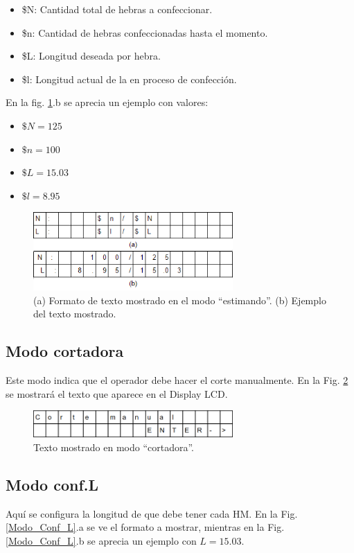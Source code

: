 \documentclass[main_conf.tex]{subfiles}
\begin{document}
\begin{itemize}
\item \$N: Cantidad total de hebras a confeccionar.
\item \$n: Cantidad de hebras confeccionadas hasta el momento.
\item \$L: Longitud deseada por hebra.
\item \$l: Longitud actual de la en proceso de confección.
\end{itemize}

En la fig. \ref{Modo_estimando}.b se aprecia un ejemplo con valores:
\begin{itemize}
\item $\$N = 125$
\item $\$n = 100$
\item $\$L = 15.03$
\item $\$l = 8.95$
\end{itemize}

\begin{figure}[!h]
  \centering
  \includegraphics[width=3.0in]{../img/modo/estimando.png}
  \caption{(a) Formato de texto mostrado en el modo “estimando”.
           (b) Ejemplo del texto mostrado.
  }
  \label{Modo_estimando}
\end{figure}

\subsection{Modo cortadora}
Este modo indica que el operador debe hacer el corte manualmente.
En la Fig. \ref{Modo_cortadora} se mostrará el texto que
aparece en el Display LCD.

\begin{figure}[!t]
  \centering
  \includegraphics[width=3.0in]{../img/modo/cortadora.png}
  \caption{Texto mostrado en modo “cortadora”.}
  \label{Modo_cortadora}
\end{figure}

\subsection{Modo conf.L}
Aquí se configura la longitud de que debe tener cada HM.
En la Fig. \ref{Modo_Conf_L}.a se ve el formato a mostrar,
mientras en la Fig. \ref{Modo_Conf_L}.b se aprecia un
ejemplo con $L = 15.03$.
\end{document}
